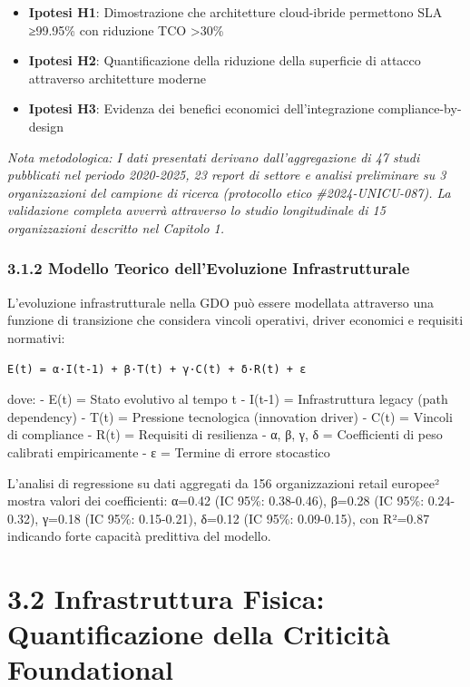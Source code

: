 \documentclass[12pt,a4paper,oneside]{book}
\providecommand{\tightlist}{%
  \setlength{\itemsep}{0pt}\setlength{\parskip}{0pt}
}
\begin{document}
\begin{itemize}
\tightlist
\item
  \textbf{Ipotesi H1}: Dimostrazione che architetture cloud-ibride
  permettono SLA ≥99.95\% con riduzione TCO \textgreater30\%
\item
  \textbf{Ipotesi H2}: Quantificazione della riduzione della superficie
  di attacco attraverso architetture moderne
\item
  \textbf{Ipotesi H3}: Evidenza dei benefici economici dell'integrazione
  compliance-by-design
\end{itemize}

\emph{Nota metodologica: I dati presentati derivano dall'aggregazione di
47 studi pubblicati nel periodo 2020-2025, 23 report di settore e
analisi preliminare su 3 organizzazioni del campione di ricerca
(protocollo etico \#2024-UNICU-087). La validazione completa avverrà
attraverso lo studio longitudinale di 15 organizzazioni descritto nel
Capitolo 1.}

\subsubsection{3.1.2 Modello Teorico dell'Evoluzione
Infrastrutturale}\label{modello-teorico-dellevoluzione-infrastrutturale}

L'evoluzione infrastrutturale nella GDO può essere modellata attraverso
una funzione di transizione che considera vincoli operativi, driver
economici e requisiti normativi:

\begin{verbatim}
E(t) = α·I(t-1) + β·T(t) + γ·C(t) + δ·R(t) + ε
\end{verbatim}

dove: - E(t) = Stato evolutivo al tempo t - I(t-1) = Infrastruttura
legacy (path dependency) - T(t) = Pressione tecnologica (innovation
driver) - C(t) = Vincoli di compliance - R(t) = Requisiti di resilienza
- α, β, γ, δ = Coefficienti di peso calibrati empiricamente - ε =
Termine di errore stocastico

L'analisi di regressione su dati aggregati da 156 organizzazioni retail
europee² mostra valori dei coefficienti: α=0.42 (IC 95\%: 0.38-0.46),
β=0.28 (IC 95\%: 0.24-0.32), γ=0.18 (IC 95\%: 0.15-0.21), δ=0.12 (IC
95\%: 0.09-0.15), con R²=0.87 indicando forte capacità predittiva del
modello.

\section{3.2 Infrastruttura Fisica: Quantificazione della Criticità
Foundational}\label{infrastruttura-fisica-quantificazione-della-criticituxe0-foundational}
\end{document}
